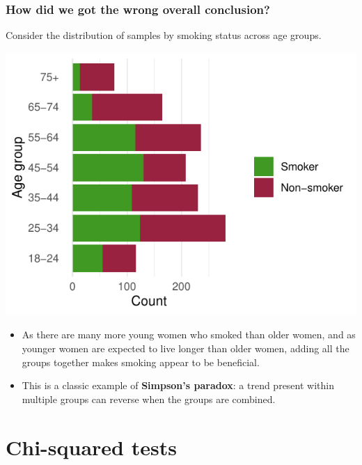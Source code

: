 \documentclass[a4paper]{article}
\begin{document}
\subsubsection{How did we got the wrong overall conclusion?}
Consider the distribution of samples by smoking status across age groups.
\begin{Schunk}


{\centering \includegraphics[width=\maxwidth]{figure/listings-unnamed-chunk-14-1} 

}

\end{Schunk}
\begin{itemize}
	\item As there are many more young women who smoked than older women, and as younger women are expected to live longer than older women, adding all the groups together makes smoking appear to be beneficial.
	\item This is a classic example of \textbf{Simpson's paradox}: a trend present within multiple groups can reverse when the groups are combined.
\end{itemize}
\section{Chi-squared tests}\label{sec:3}
\end{document}
